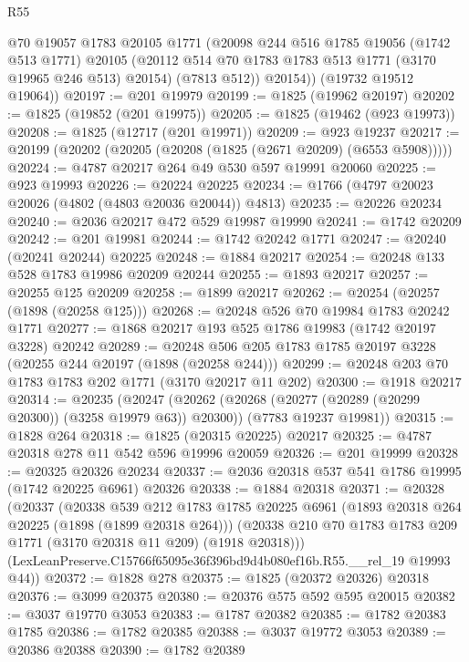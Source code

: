 \begin{lexlean}{R55}
\begin{coremodule}
          @70
          @19057
          @1783
          @20105
          @1771
          (@20098
            @244
            @516
            @1785
            @19056
            (@1742 @513 @1771)
            @20105
            (@20112 @514 @70 @1783 @1783 @513 @1771 (@3170 @19965 @246 @513) @20154)
            (@7813 @512))
          @20154))
      (@19732 @19512 @19064))
@20197 := @201 @19979
@20199 := @1825 (@19962 @20197)
@20202 := @1825 (@19852 (@201 @19975))
@20205 := @1825 (@19462 (@923 @19973))
@20208 := @1825 (@12717 (@201 @19971))
@20209 := @923 @19237
@20217 := @20199 (@20202 (@20205 (@20208 (@1825 (@2671 @20209) (@6553 @5908)))))
@20224 := @4787 @20217 @264 @49 @530 @597 @19991 @20060
@20225 := @923 @19993
@20226 := @20224 @20225
@20234 := @1766 (@4797 @20023 @20026 (@4802 (@4803 @20036 @20044)) @4813)
@20235 := @20226 @20234
@20240 := @2036 @20217 @472 @529 @19987 @19990
@20241 := @1742 @20209
@20242 := @201 @19981
@20244 := @1742 @20242 @1771
@20247 := @20240 (@20241 @20244) @20225
@20248 := @1884 @20217
@20254 := @20248 @133 @528 @1783 @19986 @20209 @20244
@20255 := @1893 @20217
@20257 := @20255 @125 @20209
@20258 := @1899 @20217
@20262 := @20254 (@20257 (@1898 (@20258 @125)))
@20268 := @20248 @526 @70 @19984 @1783 @20242 @1771
@20277 := @1868 @20217 @193 @525 @1786 @19983 (@1742 @20197 @3228) @20242
@20289 := @20248 @506 @205 @1783 @1785 @20197 @3228 (@20255 @244 @20197 (@1898 (@20258 @244)))
@20299 := @20248 @203 @70 @1783 @1783 @202 @1771 (@3170 @20217 @11 @202)
@20300 := @1918 @20217
@20314 := @20235
    (@20247
      (@20262 (@20268 (@20277 (@20289 (@20299 @20300)) (@3258 @19979 @63)) @20300))
      (@7783 @19237 @19981))
@20315 := @1828 @264
@20318 := @1825 (@20315 @20225) @20217
@20325 := @4787 @20318 @278 @11 @542 @596 @19996 @20059
@20326 := @201 @19999
@20328 := @20325 @20326 @20234
@20337 := @2036 @20318 @537 @541 @1786 @19995 (@1742 @20225 @6961) @20326
@20338 := @1884 @20318
@20371 := @20328
    (@20337
      (@20338
        @539
        @212
        @1783
        @1785
        @20225
        @6961
        (@1893 @20318 @264 @20225 (@1898 (@1899 @20318 @264)))
        (@20338 @210 @70 @1783 @1783 @209 @1771 (@3170 @20318 @11 @209) (@1918 @20318)))
      (LexLeanPreserve.C15766f65095e36f396bd9d4b080ef16b.R55.__rel_19 @19993 @44))
@20372 := @1828 @278
@20375 := @1825 (@20372 @20326) @20318
@20376 := @3099 @20375
@20380 := @20376 @575 @592 @595 @20015
@20382 := @3037 @19770 @3053
@20383 := @1787 @20382
@20385 := @1782 @20383 @1785
@20386 := @1782 @20385
@20388 := @3037 @19772 @3053
@20389 := @20386 @20388
@20390 := @1782 @20389

\end{coremodule}
\end{lexlean}
